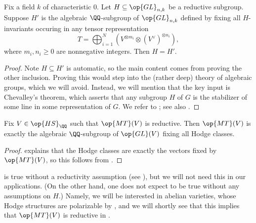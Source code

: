 \documentclass[../thesis.tex]{subfiles}
\begin{document}
\begin{proposition} \label{prop:reductive-group-by-invariants}
	Fix a field $k$ of characteristic $0$. Let $H\subseteq\op{GL}_{n,k}$ be a reductive subgroup. Suppose $H'$ is the algebraic $\QQ$-subgroup of $\op{GL}_{n,k}$ defined by fixing all $H$-invariants occuring in any tensor representation
	\[T=\bigoplus_{i=1}^N\left(V^{\otimes m_i}\otimes (V^\lor)^{\otimes n_i}\right),\]
	where $m_i,n_i\ge0$ are nonnegative integers. Then $H=H'$.
\end{proposition}
\begin{proof}
	Note $H\subseteq H'$ is automatic, so the main content comes from proving the other inclusion. Proving this would step into the (rather deep) theory of algebraic groups, which we will avoid. Instead, we will mention that the key input is Chevalley's theorem, which asserts that any subgroup $H$ of $G$ is the stabilizer of some line in some representation of $G$. We refer to \cite[Proposition~3.1]{deligne-hodge}; see also \cite[Theorem~4.27]{milne-alg-groups}.
\end{proof}
\begin{corollary} \label{cor:mt-by-classes}
	Fix $V\in\op{HS}_\QQ$ such that $\op{MT}(V)$ is reductive. Then $\op{MT}(V)$ is exactly the algebraic $\QQ$-subgroup of $\op{GL}(V)$ fixing all Hodge classes.
\end{corollary}
\begin{proof}
	 explains that the Hodge classes are exactly the vectors fixed by $\op{MT}(V)$, so this follows from .
\end{proof}
\begin{remark}
	 is true without a reductivity assumption (see \cite[Proposition~3.4]{deligne-hodge}), but we will not need this in our applications. (On the other hand, one does not expect  to be true without any assumptions on $H$.) Namely, we will be interested in abelian varieties, whose Hodge structures are polarizable by , and we will shortly see that this implies that $\op{MT}(V)$ is reductive in .
\end{remark}
\end{document}
